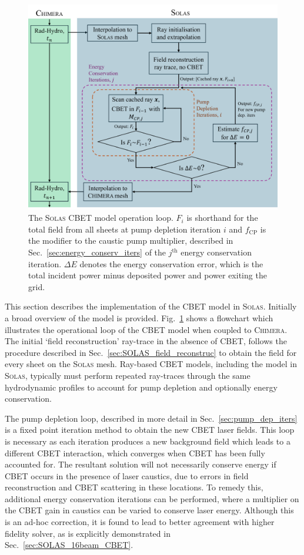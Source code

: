 \begin{figure}[t!]
    \includegraphics[width=0.9\linewidth]{Numerics/Images/CBET_flowchart.PNG}
    \centering
    \caption{The \textsc{Solas} \ac{CBET} model operation loop.
    $F_i$ is shorthand for the total field from all sheets at pump depletion iteration $i$ and $f_{\text{CP}}$ is the modifier to the caustic pump multiplier, described in Sec.~\ref{sec:energy_conserv_iters} of the $j^{\text{th}}$ energy conservation iteration.
    $\Delta E$ denotes the energy conservation error, which is the total incident power minus deposited power and power exiting the grid.}%
    \label{fig:SOLAS_CBET_flowchart}
\end{figure}

This section describes the implementation of the \ac{CBET} model in \textsc{Solas}.
Initially a broad overview of the model is provided.
Fig.~\ref{fig:SOLAS_CBET_flowchart} shows a flowchart which illustrates the operational loop of the \ac{CBET} model when coupled to \textsc{Chimera}.
The initial `field reconstruction' ray-trace in the absence of \ac{CBET}, follows the procedure described in Sec.~\ref{sec:SOLAS_field_reconstruc} to obtain the field for every sheet on the \textsc{Solas} mesh.
Ray-based \ac{CBET} models, including the model in \textsc{Solas}, typically must perform repeated ray-traces through the same hydrodynamic profiles to account for pump depletion and optionally energy conservation.

The pump depletion loop, described in more detail in Sec.~\ref{sec:pump_dep_iters} is a fixed point iteration method to obtain the new \ac{CBET} laser fields.
This loop is necessary as each iteration produces a new background field which leads to a different \ac{CBET} interaction, which converges when \ac{CBET} has been fully accounted for.
The resultant solution will not necessarily conserve energy if \ac{CBET} occurs in the presence of laser caustics, due to errors in field reconstruction and \ac{CBET} scattering in these locations.
To remedy this, additional energy conservation iterations can be performed, where a multiplier on the \ac{CBET} gain in caustics can be varied to conserve laser energy.
Although this is an ad-hoc correction, it is found to lead to better agreement with higher fidelity solver, as is explicitly demonstrated in Sec.~\ref{sec:SOLAS_16beam_CBET}.

